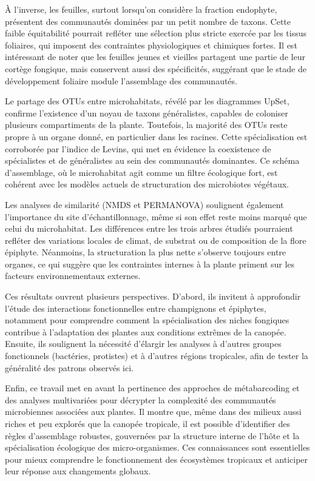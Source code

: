 \documentclass[alpha-refs,twocolumn]{wiley-article}
\begin{document}
À l’inverse, les feuilles, surtout lorsqu’on considère la fraction endophyte, présentent des communautés dominées par un petit nombre de taxons. Cette faible équitabilité pourrait refléter une sélection plus stricte exercée par les tissus foliaires, qui imposent des contraintes physiologiques et chimiques fortes. Il est intéressant de noter que les feuilles jeunes et vieilles partagent une partie de leur cortège fongique, mais conservent aussi des spécificités, suggérant que le stade de développement foliaire module l’assemblage des communautés.

Le partage des OTUs entre microhabitats, révélé par les diagrammes UpSet, confirme l’existence d’un noyau de taxons généralistes, capables de coloniser plusieurs compartiments de la plante. Toutefois, la majorité des OTUs reste propre à un organe donné, en particulier dans les racines. Cette spécialisation est corroborée par l’indice de Levins, qui met en évidence la coexistence de spécialistes et de généralistes au sein des communautés dominantes. Ce schéma d’assemblage, où le microhabitat agit comme un filtre écologique fort, est cohérent avec les modèles actuels de structuration des microbiotes végétaux.

Les analyses de similarité (NMDS et PERMANOVA) soulignent également l’importance du site d’échantillonnage, même si son effet reste moins marqué que celui du microhabitat. Les différences entre les trois arbres étudiés pourraient refléter des variations locales de climat, de substrat ou de composition de la flore épiphyte. Néanmoins, la structuration la plus nette s’observe toujours entre organes, ce qui suggère que les contraintes internes à la plante priment sur les facteurs environnementaux externes.

Ces résultats ouvrent plusieurs perspectives. D’abord, ils invitent à approfondir l’étude des interactions fonctionnelles entre champignons et épiphytes, notamment pour comprendre comment la spécialisation des niches fongiques contribue à l’adaptation des plantes aux conditions extrêmes de la canopée. Ensuite, ils soulignent la nécessité d’élargir les analyses à d’autres groupes fonctionnels (bactéries, protistes) et à d’autres régions tropicales, afin de tester la généralité des patrons observés ici.

Enfin, ce travail met en avant la pertinence des approches de métabarcoding et des analyses multivariées pour décrypter la complexité des communautés microbiennes associées aux plantes. Il montre que, même dans des milieux aussi riches et peu explorés que la canopée tropicale, il est possible d’identifier des règles d’assemblage robustes, gouvernées par la structure interne de l’hôte et la spécialisation écologique des micro-organismes. Ces connaissances sont essentielles pour mieux comprendre le fonctionnement des écosystèmes tropicaux et anticiper leur réponse aux changements globaux.


\end{document}
